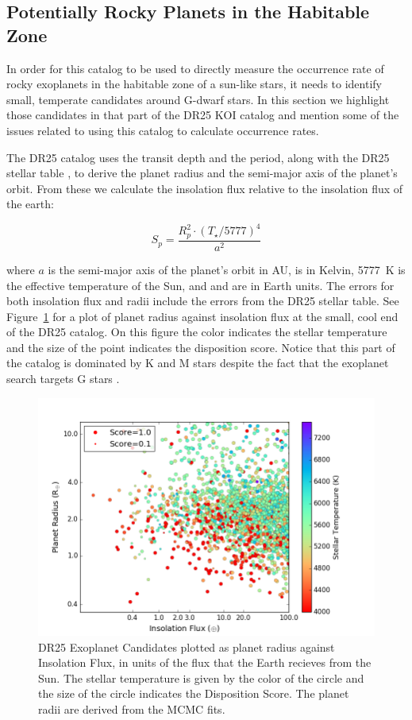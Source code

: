 \label{s:hz}
\subsection{Potentially Rocky Planets in the Habitable Zone}
In order for this catalog to be used to directly measure the occurrence rate of rocky exoplanets in the habitable zone of a sun-like stars, it needs to identify small, temperate candidates around G-dwarf stars.  In this section we highlight those candidates in that part of the DR25 KOI catalog and mention some of the issues related to using this catalog to calculate occurrence rates.

The DR25 catalog uses the transit depth and the period, along with the DR25 stellar table \citet{Mathur2017ApJS}, to derive the planet radius and the semi-major axis of the planet's orbit.  From these we calculate the insolation flux relative to the insolation flux of the earth:

\begin{equation}
S_{p} = \frac{R_{p}^{2} \cdot (T_{\star}/5777)^{4}}{a^{2}}
\end{equation}

\noindent where $a$ is the semi-major axis of the planet's orbit in AU, \tstar{} is in Kelvin, 5777~K is the effective temperature of the Sun, and \sp{} and \rp{} are in Earth units. The errors for both insolation flux and radii include the errors from the DR25 stellar table. See Figure~\ref{f:hzPlot} for a plot of planet radius against insolation flux at the small, cool end of the DR25 catalog. On this figure the color indicates the stellar temperature and the size of the point indicates the disposition score.  Notice that this part of the catalog is dominated by K and M stars despite the fact that the exoplanet search targets G stars \citet{Batalha2010}.

\begin{figure}
    \centering
    \includegraphics[width=1.1\linewidth]{fig-CatalogRadiusInsolScore.png}
    \caption{DR25 Exoplanet Candidates plotted as planet radius against Insolation Flux, in units of the flux that the Earth recieves from the Sun. The stellar temperature is given by the color of the circle and the size of the circle indicates the Disposition Score. The planet radii are derived from the MCMC fits. }
    \label{f:hzPlot}
\end{figure}

